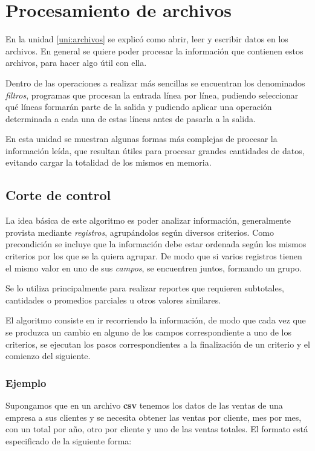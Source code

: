 \chapter{Procesamiento de archivos}

En la unidad \ref{uni:archivos} se explicó como abrir, leer y escribir datos en
los archivos.  En general se quiere poder procesar la información que contienen
estos archivos, para hacer algo útil con ella.

Dentro de las operaciones a realizar más sencillas se encuentran los
denominados {\it filtros}, programas que procesan la entrada línea por
línea, pudiendo seleccionar qué líneas formarán parte de la salida y
pudiendo aplicar una operación determinada a cada una de estas líneas antes
de pasarla a la salida.

En esta unidad se muestran algunas formas más complejas de procesar la
información leída, que resultan útiles para procesar grandes cantidades de
datos, evitando cargar la totalidad de los mismos en memoria.

\section{Corte de control}

La idea básica de este algoritmo es poder analizar información, generalmente
provista mediante \textit{registros}, agrupándolos según diversos criterios.
Como precondición se incluye que la información debe estar ordenada según
los mismos criterios por los que se la quiera agrupar. De modo que si
varios registros tienen el mismo valor en uno de sus \textit{campos}, se
encuentren juntos, formando un grupo.

Se lo utiliza principalmente para realizar reportes que requieren
subtotales, cantidades o promedios parciales u otros valores similares.

El algoritmo consiste en ir recorriendo la información, de modo que cada vez
que se produzca un cambio en alguno de los campos correspondiente a uno de los
criterios, se ejecutan los pasos correspondientes a la finalización de un
criterio y el comienzo del siguiente.

\subsection*{Ejemplo}

Supongamos que en un archivo \textbf{csv} tenemos los datos de las ventas de
una empresa a sus clientes y se necesita obtener las ventas por cliente,
mes por mes, con un total por año, otro por cliente y uno de las ventas
totales. El formato está especificado de la siguiente forma:

